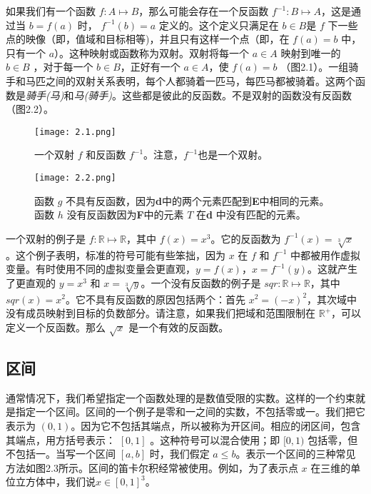 \documentclass[lang=cn,10pt]{elegantbook}
\begin{document}
如果我们有一个函数 $f : A \mapsto B$，那么可能会存在一个反函数 $f^{-1} : B \mapsto A$，这是通过当 $b = f(a)$ 时， $f^{-1}(b) = a$ 定义的。这个定义只满足在 $b \in B$是 $f$ 下一些点的映像（即，值域和目标相等)，并且只有这样一个点（即，在 $f(a) = b$ 中，只有一个 $a$）。这种映射或函数称为双射。双射将每一个 $a \in A$ 映射到唯一的 $b \in B$ ，对于每一个 $b \in B$，正好有一个 $a \in A$，使 $f(a)=b$ （图2.1）。一组骑手和马匹之间的双射关系表明，每个人都骑着一匹马，每匹马都被骑着。这两个函数是\textit{骑手(马)}和\textit{马(骑手)}。这些都是彼此的反函数。不是双射的函数没有反函数（图2.2）。

\begin{figure}[htb]
\centering
\begin{minipage}[t]{0.45\textwidth}
\centering
\texttt{[image: 2.1.png]}
\caption{一个双射 $f$ 和反函数 $f^{-1}$。注意，$f^{-1}$也是一个双射。}
\end{minipage}
\begin{minipage}[t]{0.45\textwidth}
\centering
\texttt{[image: 2.2.png]}
\caption{函数 $g$ 不具有反函数，因为\textbf{d}中的两个元素匹配到\textbf{E}中相同的元素。函数 $h$ 没有反函数因为\textbf{F}中的元素 $T$ 在\textbf{d} 中没有匹配的元素。}
\end{minipage}
\end{figure}

一个双射的例子是 $f : \mathbb{R} \mapsto \mathbb{R}$，其中 $f(x) = x^3$。它的反函数为 $f^{-1}(x) = \sqrt[3]{x}$ 。这个例子表明，标准的符号可能有些笨拙，因为 $x$ 在 $f$ 和 $f^{-1}$ 中都被用作虚拟变量。有时使用不同的虚拟变量会更直观，$y = f(x)$，$x=f^{-1}(y)$。这就产生了更直观的 $y = x^3$ 和 $x = \sqrt[3]{y}$。一个没有反函数的例子是 $sqr : \mathbb{R} \mapsto \mathbb{R}$，其中 $sqr(x) = x^2$。它不具有反函数的原因包括两个：首先 $x^2 = (-x)^2$，其次域中没有成员映射到目标的负数部分。请注意，如果我们把域和范围限制在 $\mathbb{R^+}$，可以定义一个反函数。那么 $\sqrt{x}$ 是一个有效的反函数。

\subsection{区间}

通常情况下，我们希望指定一个函数处理的是数值受限的实数。这样的一个约束就是指定一个区间。区间的一个例子是零和一之间的实数，不包括零或一。我们把它表示为 $(0,1)$。因为它不包括其端点，所以被称为开区间。相应的闭区间，包含其端点，用方括号表示： $[ 0 , 1 ]$ 。这种符号可以混合使用；即 $[0,1)$ 包括零，但不包括一。当写一个区间 $[a,b]$ 时，我们假定 $a \leq b$。表示一个区间的三种常见方法如图2.3所示。区间的笛卡尔积经常被使用。例如，为了表示点 $x$ 在三维的单位立方体中，我们说$x \in [0, 1]^3$。
\end{document}
